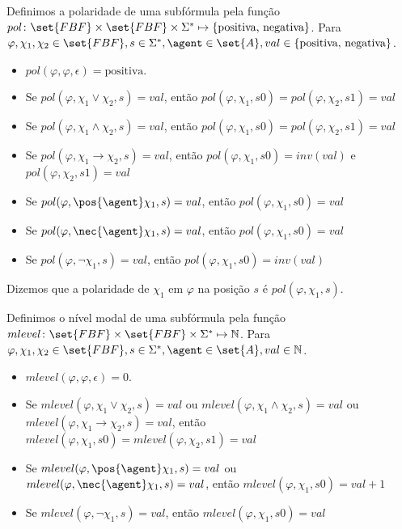 \begin{definition}
	Definimos a polaridade de uma subfórmula pela função $pol \colon \set{FBF} \times \set{FBF} \times \Sigma^* \mapsto \{\text{positiva, negativa}\}$.  Para $\varphi, \chi_1, \chi_2 \in \set{FBF}, s \in \Sigma^*, \agent \in \set{A}, val \in \{\text{positiva, negativa}\}$.
	
	\begin{itemize}
		\item $pol(\varphi, \varphi, \epsilon) = \text{positiva}$.
		\item Se $pol(\varphi, \chi_1 \lor \chi_2, s) = val$, então $pol(\varphi, \chi_1, s0) = pol(\varphi, \chi_2, s1) = val$
		\item Se $pol(\varphi, \chi_1 \land \chi_2, s) = val$, então $pol(\varphi, \chi_1, s0) = pol(\varphi, \chi_2, s1) = val$
		\item Se $pol(\varphi, \chi_1 \rightarrow \chi_2, s) = val$, então $pol(\varphi, \chi_1, s0) = inv(val)$ e $pol(\varphi, \chi_2, s1) = val$
		\item Se $pol(\varphi, \pos{\agent}\chi_1, s) = val$, então $pol(\varphi, \chi_1, s0) = val$
		\item Se $pol(\varphi, \nec{\agent}\chi_1, s) = val$, então $pol(\varphi, \chi_1, s0) = val$
		\item Se $pol(\varphi, \neg\chi_1, s) = val$, então $pol(\varphi, \chi_1, s0) = inv(val)$
	\end{itemize}
	
\end{definition}
Dizemos que a polaridade de $\chi_1$ em $\varphi$ na posição $s$ é $pol(\varphi, \chi_1, s)$.

\begin{definition}
	Definimos o nível modal de uma subfórmula pela função $mlevel \colon \set{FBF} \times \set{FBF} \times \Sigma^* \mapsto \mathbb{N}$. Para $\varphi, \chi_1, \chi_2 \in \set{FBF}, s \in \Sigma^*, \agent \in \set{A}, val \in \mathbb{N}$.
	
	\begin{itemize}
		\item $mlevel(\varphi, \varphi, \epsilon) = 0$.
		\item Se $mlevel(\varphi, \chi_1 \lor \chi_2, s) = val$ ou $mlevel(\varphi, \chi_1 \land \chi_2, s) = val$ ou $mlevel(\varphi, \chi_1 \rightarrow \chi_2, s) = val$, então $mlevel(\varphi, \chi_1, s0) = mlevel(\varphi, \chi_2, s1) = val$
		\item Se $mlevel(\varphi, \pos{\agent}\chi_1, s) = val$ ou $mlevel(\varphi, \nec{\agent}\chi_1, s) = val$, então $mlevel(\varphi, \chi_1, s0) = val+1$
		\item Se $mlevel(\varphi, \neg\chi_1, s) = val$, então $mlevel(\varphi, \chi_1, s0) = val$
	\end{itemize}
\end{definition}


